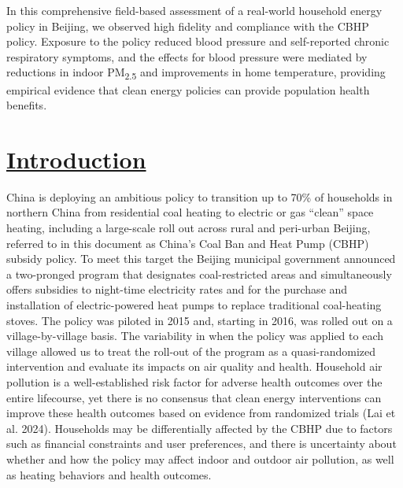 \documentclass[
  letterpaper,
  DIV=11,
  numbers=noendperiod]{scrartcl}
\providecommand{\DIFadd}[1]{{\protect\color{blue}\underline{#1}}} %
\providecommand{\DIFaddbegin}{} %
\providecommand{\DIFaddend}{} %
\providecommand{\DIFdelbegin}{} %
\providecommand{\DIFdelend}{} %
\newcommand{\DIFscaledelfig}{0.5}
\newlength{\DIFdelgraphicswidth} %
\newlength{\DIFdelgraphicsheight} %
\newcommand{\DIFaddincludegraphics}[2][]{{\color{blue}\fbox{\DIFOincludegraphics[#1]{#2}}}} %
\newcommand{\DIFdelincludegraphics}[2][]{%
\sbox{\DIFdelgraphicsbox}{\DIFOincludegraphics[#1]{#2}}%
\settoboxwidth{\DIFdelgraphicswidth}{\DIFdelgraphicsbox} %
\settoboxtotalheight{\DIFdelgraphicsheight}{\DIFdelgraphicsbox} %
\scalebox{\DIFscaledelfig}{%
\parbox[b]{\DIFdelgraphicswidth}{\usebox{\DIFdelgraphicsbox}\\[-\baselineskip] \rule{\DIFdelgraphicswidth}{0em}}\llap{\resizebox{\DIFdelgraphicswidth}{\DIFdelgraphicsheight}{%
\setlength{\unitlength}{\DIFdelgraphicswidth}%
\begin{picture}(1,1)%
\thicklines\linethickness{2pt} %
{\color[rgb]{1,0,0}\put(0,0){\framebox(1,1){}}}%
{\color[rgb]{1,0,0}\put(0,0){\line( 1,1){1}}}%
{\color[rgb]{1,0,0}\put(0,1){\line(1,-1){1}}}%
\end{picture}%
}\hspace*{3pt}}} %
} %
\DeclareRobustCommand{\DIFaddbegin}{\DIFOaddbegin \let\includegraphics\DIFaddincludegraphics} %
\DeclareRobustCommand{\DIFaddend}{\DIFOaddend \let\includegraphics\DIFOincludegraphics} %
\DeclareRobustCommand{\DIFdelbegin}{\DIFOdelbegin \let\includegraphics\DIFdelincludegraphics} %
\DeclareRobustCommand{\DIFdelend}{\DIFOaddend \let\includegraphics\DIFOincludegraphics} %
\begin{document}
In this comprehensive field-based assessment of a real-world household
energy policy in Beijing, we observed high fidelity and compliance with
the CBHP policy. Exposure to the policy reduced blood pressure and
self-reported chronic respiratory symptoms, and the effects for blood
pressure were mediated by reductions in indoor PM\textsubscript{2.5} and
improvements in home temperature, providing empirical evidence that
clean energy policies can provide population health benefits.

\newpage

\DIFdelbegin %
\DIFdelend \DIFaddbegin \section{\DIFadd{Introduction}}\label{introduction-1}
\DIFaddend 

China is deploying an ambitious policy to transition up to 70\% of
households in northern China from residential coal heating to electric
or gas ``clean'' space heating, including a large-scale roll out across
rural and peri-urban Beijing, referred to in this document as China's
Coal Ban and Heat Pump (CBHP) subsidy policy. To meet this target the
Beijing municipal government announced a two-pronged program that
designates coal-restricted areas and simultaneously offers subsidies to
night-time electricity rates and for the purchase and installation of
electric-powered heat pumps to replace traditional coal-heating stoves.
The policy was piloted in 2015 and, starting in 2016, was rolled out on
a village-by-village basis. The variability in when the policy was
applied to each village allowed us to treat the roll-out of the program
as a quasi-randomized intervention and evaluate its impacts on air
quality and health. Household air pollution is a well-established risk
factor for adverse health outcomes over the entire lifecourse, yet there
is no consensus that clean energy interventions can improve these health
outcomes based on evidence from randomized trials (Lai et al. 2024).
Households may be differentially affected by the CBHP due to factors
such as financial constraints and user preferences, and there is
uncertainty about whether and how the policy may affect indoor and
outdoor air pollution, as well as heating behaviors and health outcomes.
\end{document}
